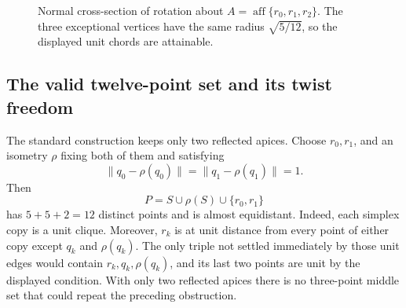 \documentclass[11pt]{article}
\begin{document}
\begin{figure}[htbp]
\centering
{}
\caption{Normal cross-section of rotation about
$A=\operatorname{aff}\{r_0,r_1,r_2\}$.  The three exceptional vertices have
the same radius $\sqrt{5/12}$, so the displayed unit chords are attainable.}
\label{fig:three-apex-rotation}
\end{figure}

\subsection{The valid twelve-point set and its twist freedom}

The standard construction keeps only two reflected apices.  Choose
$r_0,r_1$, and an isometry $\rho$ fixing both of them and satisfying
\[
 \lVert q_0-\rho(q_0)\rVert
 =\lVert q_1-\rho(q_1)\rVert=1.
\]
Then
\[
 P=S\cup\rho(S)\cup\{r_0,r_1\}
\]
has $5+5+2=12$ distinct points and is almost equidistant.  Indeed, each
simplex copy is a unit clique.  Moreover, $r_k$ is at unit distance from
every point of either copy except $q_k$ and $\rho(q_k)$.  The only triple not
settled immediately by those unit edges would contain
$r_k,q_k,\rho(q_k)$, and its last two points are unit by the displayed
condition.  With only two reflected apices there is no three-point middle
set that could repeat the preceding obstruction.
\end{document}
